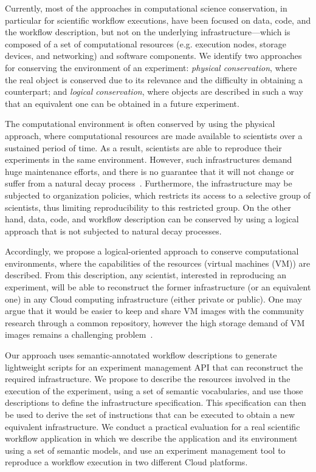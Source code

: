 \documentclass[final,5p,times,twocolumn]{elsarticle}
\begin{document}
Currently, most of the approaches in computational science conservation, in particular for scientific workflow executions, have been focused on data, code, and the workflow description, but not on the underlying infrastructure---which is composed of a set of computational resources (e.g. execution nodes, storage devices, and networking) and software components. We identify two approaches for conserving the environment of an experiment: \emph{physical conservation}, where the real object is conserved due to its relevance and the difficulty in obtaining a counterpart; and \emph{logical conservation}, where objects are described in such a way that an equivalent one can be obtained in a future experiment.

The computational environment is often conserved by using the physical approach, where computational resources are made available to scientists over a sustained period of time. As a result, scientists are able to reproduce their experiments in the same environment. However, such infrastructures demand huge maintenance efforts, and there is no guarantee that it will not change or suffer from a natural decay process~\cite{Gavish2011637}. Furthermore, the infrastructure may be subjected to organization policies, which restricts its access to a selective group of scientists, thus limiting reproducibility to this restricted group. On the other hand, data, code, and workflow description can be conserved by using a logical approach that is not subjected to natural decay processes. 

Accordingly, we propose a logical-oriented approach to conserve computational environments, where the capabilities of the resources (virtual machines (VM)) are described. From this description, any scientist, interested in reproducing an experiment, will be able to reconstruct the former infrastructure (or an equivalent one) in any Cloud computing infrastructure (either private or public). One may argue that it would be easier to keep and share VM images with the community research through a common repository, however the high storage demand of VM images remains a challenging problem~\cite{Mao:2014:ROD:2600090.2512348,6552826}. 

Our approach uses semantic-annotated workflow descriptions to generate lightweight scripts for an experiment management API that can reconstruct the required infrastructure. We propose to describe the resources involved in the execution of the experiment, using a set of semantic vocabularies, and use those descriptions to define the infrastructure specification. This specification can then be used to derive the set of instructions that can be executed to obtain a new equivalent infrastructure. We conduct a practical evaluation for a real scientific workflow application in which we describe the application and its environment using a set of semantic models, and use an experiment management tool to reproduce a workflow execution in two different Cloud platforms. 
\end{document}
